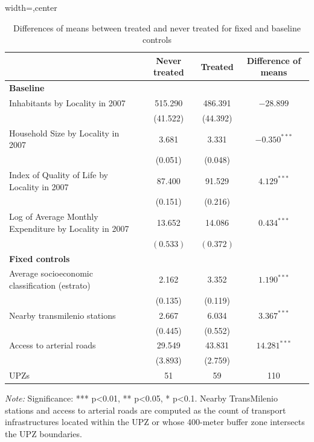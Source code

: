 \documentclass[12pt]{article}
\begin{document}
\begin{table} [H]
  \centering
  \caption{ Differences of means between treated and never treated for fixed and baseline controls}
  \label{tab:diferencias_medias_controles_fijos}
  \begin{adjustbox}{width=\textwidth,center}
    \begin{tabular}{l c c c}
      \toprule
      \multicolumn{1}{c}{} & \multicolumn{1}{c}{\textbf{Never treated}} & \multicolumn{1}{c}{\textbf{Treated}} & \multicolumn{1}{c}{\textbf{Difference of means}} \\
      \midrule
       \midrule
      \multicolumn{4}{l}{\textbf{Baseline}} \\
      \midrule
      Inhabitants by Locality in 2007 & 515.290 & 486.391 & $-28.899$ \\
      & (41.522) & (44.392) & \\
      Household Size by Locality in 2007 & 3.681 & 3.331 & $-0.350^{***}$ \\
      & (0.051) & (0.048) & \\
      Index of Quality of Life by Locality in 2007 & 87.400 & 91.529 & $4.129^{***}$ \\
      & (0.151) & (0.216) & \\
      Log of Average Monthly Expenditure by Locality in 2007 & 13.652 & 14.086 & $0.434^{***}$\\
      & $(0.533)$ & $(0.372)$ & \\
      \midrule
      \multicolumn{4}{l}{\textbf{Fixed controls}} \\
      \midrule
      Average socioeconomic classification (estrato) & 2.162 & 3.352 & $1.190^{***}$ \\
      & (0.135) & (0.119) & \\
      Nearby transmilenio stations & 2.667 & 6.034 & $3.367^{***}$ \\
      & (0.445) & (0.552) & \\
      Access to arterial roads & 29.549 & 43.831 & $14.281^{***}$ \\
      & (3.893) & (2.759) & \\
      \midrule
      \midrule
      UPZs & 51 & 59 & 110 \\
      \bottomrule
    \end{tabular}
  \end{adjustbox}
   \parbox[t]{\textwidth}{%
    \vspace{0.5em}
    \footnotesize{ 
        \textit{Note:} Significance: *** p<0.01, ** p<0.05, * p<0.1.
        Nearby TransMilenio stations and access to arterial roads are computed as the count of transport infrastructures located within the UPZ or whose 400-meter buffer zone intersects the UPZ boundaries.
    }}
\end{table}
\end{document}
